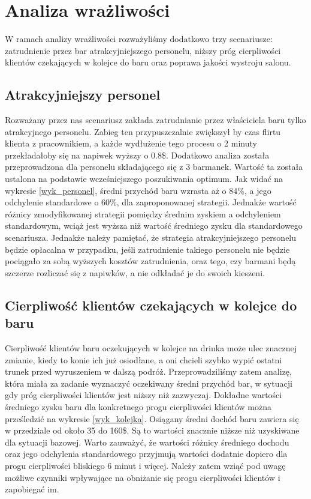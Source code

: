 \documentclass[12pt, a4paper, oneside]{mwart} %
\begin{document}
\section{Analiza wrażliwości}
W ramach analizy wrażliwości rozważyliśmy dodatkowo trzy scenariusze: zatrudnienie przez bar atrakcyjniejszego personelu, niższy próg cierpliwości klientów czekających w kolejce do baru oraz poprawa jakości wystroju salonu.

\subsection{Atrakcyjniejszy personel}
Rozważany przez nas scenariusz zakłada zatrudnianie przez właściciela baru tylko atrakcyjnego personelu. Zabieg ten przypuszczalnie zwiększył by czas flirtu klienta z pracownikiem, a każde wydłużenie tego procesu o 2 minuty przekładałoby się na napiwek wyższy o 0.8\$. Dodatkowo analiza została przeprowadzona dla personelu składającego się z 3 barmanek. Wartość ta została ustalona na podstawie wcześniejszego poszukiwania optimum. Jak widać na wykresie \ref{wyk_personel}, średni przychód baru wzrasta aż o 84\%, a jego odchylenie standardowe o 60\%, dla zaproponowanej strategii. Jednakże wartość różnicy zmodyfikowanej strategii pomiędzy średnim zyskiem a odchyleniem standardowym, wciąż jest wyższa niż wartość średniego zysku dla standardowego scenariusza. Jednakże należy pamiętać, że strategia atrakcyjniejszego personelu będzie opłacalna w przypadku, jeśli zatrudnienie takiego personelu nie będzie pociągało za sobą wyższych kosztów zatrudnienia, oraz tego, czy barmani będą szczerze rozliczać się z napiwków, a nie odkładać je do swoich kieszeni.

\subsection{Cierpliwość klientów czekających w kolejce do baru}
Cierpliwość klientów baru oczekujących w kolejce na drinka może ulec znacznej zmianie, kiedy to konie ich już osiodłane, a oni chcieli szybko wypić ostatni trunek przed wyruszeniem w dalszą podróż. Przeprowadziliśmy zatem analizę, która miała za zadanie wyznaczyć oczekiwany średni przychód bar, w sytuacji gdy próg cierpliwości klientów jest niższy niż zazwyczaj. Dokładne wartości średniego zysku baru dla konkretnego progu cierpliwości klientów można prześledzić na wykresie \ref{wyk_kolejka}. Osiągany średni dochód baru zawiera się w przedziale od około 35 do 160\$. Są to wartości znacznie niższe niż uzyskiwane dla sytuacji bazowej. Warto zauważyć, że wartości różnicy średniego dochodu oraz jego odchylenia standardowego przyjmują wartości dodatnie dopiero dla progu cierpliwości bliskiego 6 minut i więcej. Należy zatem wziąć pod uwagę możliwe czynniki wpływające na obniżanie się progu cierpliwości klientów i zapobiegać im.
\end{document}
